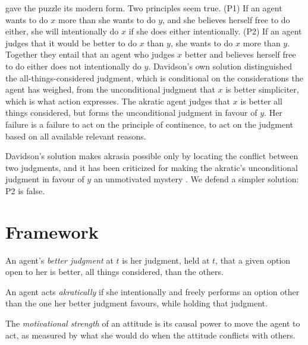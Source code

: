 \documentclass{situationist-preprint}
\begin{document}
\citet{Davidson1970} gave the puzzle its modern form. Two principles seem true. (P1) If an agent wants to do $x$ more than she wants to do $y$, and she believes herself free to do either, she will intentionally do $x$ if she does either intentionally. (P2) If an agent judges that it would be better to do $x$ than $y$, she wants to do $x$ more than $y$. Together they entail that an agent who judges $x$ better and believes herself free to do either does not intentionally do $y$. Davidson's own solution distinguished the all-things-considered judgment, which is conditional on the considerations the agent has weighed, from the unconditional judgment that $x$ is better simpliciter, which is what action expresses. The akratic agent judges that $x$ is better all things considered, but forms the unconditional judgment in favour of $y$. Her failure is a failure to act on the principle of continence, to act on the judgment based on all available relevant reasons.

Davidson's solution makes akrasia possible only by locating the conflict between two judgments, and it has been criticized for making the akratic's unconditional judgment in favour of $y$ an unmotivated mystery \citep{Watson1977,Mele1987}. We defend a simpler solution: P2 is false.

\section{Framework}

\begin{definition}\label{d:judg}
An agent's \emph{better judgment} at $t$ is her judgment, held at $t$, that a given option open to her is better, all things considered, than the others.
\end{definition}

\begin{definition}\label{d:akr}
An agent acts \emph{akratically} if she intentionally and freely performs an option other than the one her better judgment favours, while holding that judgment.
\end{definition}

\begin{definition}\label{d:strength}
The \emph{motivational strength} of an attitude is its causal power to move the agent to act, as measured by what she would do when the attitude conflicts with others.
\end{definition}
\end{document}
